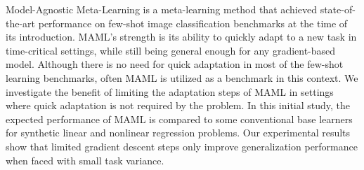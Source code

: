 Model-Agnostic Meta-Learning is a meta-learning method that achieved state-of-the-art performance on few-shot image classification benchmarks at the time of its introduction. MAML's strength is its ability to quickly adapt to a new task in time-critical settings, while still being general enough for any gradient-based model. Although there is no need for quick adaptation in most of the few-shot learning benchmarks, often MAML is utilized as a benchmark in this context. We investigate the benefit of limiting the adaptation steps of MAML in settings where quick adaptation is not required by the problem. In this initial study, the expected performance of MAML is compared to some conventional base learners for synthetic linear and nonlinear regression problems. Our experimental results show that limited gradient descent steps only improve generalization performance when faced with small task variance. 

